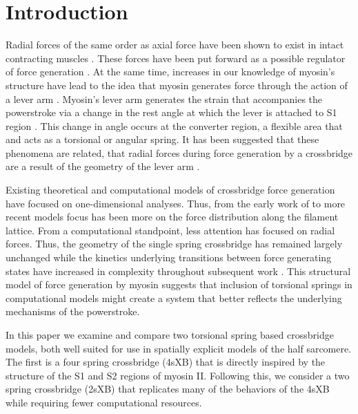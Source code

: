 \documentclass[]{article}
\begin{document}
\section{Introduction} %


Radial forces of the same order as axial force have been shown to exist in  intact contracting muscles . %
These forces have been put forward as a possible regulator of force generation . %
At the same time, increases in our knowledge of myosin's structure have lead to the idea that myosin generates force through the action of a lever arm \citep{Rayment1993, Uyeda1996, Huxley2000}.
Myosin's lever arm generates the strain that accompanies the powerstroke via a change in the rest angle at which the lever is attached to S1 region \citep{Huxley2000, Houdusse:2001:p182}. 
This change in angle occurs at the converter region, a flexible area that and acts as a torsional or angular spring. 
It has been suggested that these phenomena are related, that radial forces during force generation by a crossbridge are a result of the geometry of the lever arm \citep{Schoenberg1980b}. 

Existing theoretical and computational models of crossbridge force generation have focused on one-dimensional analyses. 
Thus, from the early work of \citet{Huxley1957} to more recent models \citep{Daniel1998, Chase:2004:p204, Tanner:2007:pe115} focus has been more on the force distribution along the filament lattice.  
From a computational standpoint, less attention has focused on radial forces. 
Thus, the geometry of the single spring crossbridge has remained largely unchanged while the kinetics underlying transitions between force generating states have increased in complexity throughout subsequent work \citep{Pate1989, Daniel1998, Tanner:2007:pe115}.
This structural model of force generation by myosin suggests that inclusion of torsional springs in computational models might create a system that better reflects the underlying mechanisms of the powerstroke. 

In this paper we examine and compare two torsional spring based crossbridge models, both well suited for use in spatially explicit models of the half sarcomere. 
The first is a four spring crossbridge (4sXB) that is directly inspired by the structure of the S1 and S2 regions of myosin II. 
Following this, we consider a two spring crossbridge (2sXB) that replicates many of the behaviors of the 4sXB while requiring fewer computational resources.
\end{document}
